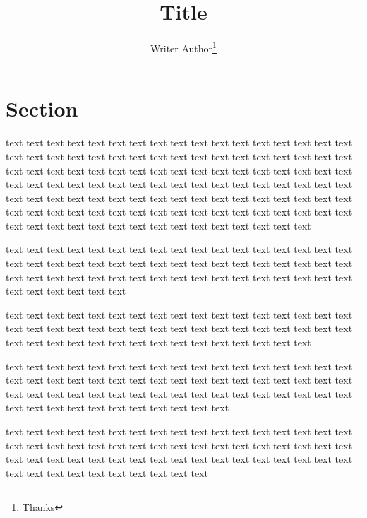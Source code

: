 \documentclass[twocolumn]{article}
\title{Title}
\author{Writer Author\thanks{Thanks}}
\begin{document}
\sloppy%

\maketitle

%
\section{Section}
text text text text text text text text text text text text text text text text text text text text text text text text text text text text text text text text text text text text text text text text text text text text text text text text text text text text text text text text text text text text text text text
    text text text text text text text text text text text text text text text text text text text text text text text text text text text text text text text text text text text text text text text text text text text text text text text text text text text text text text

    text text text text text text text text text text text text text text text text text text text text text text text text text text text text text text text text text text text text text text text text text text text text text text text text text text text text text text text text text

    text text \cite{citation1} text text text text text text text text text text text text text text text text text text text text text text text text text text text text text text text text text text text text text text text text text text text text text text text

    text text text text text text text text text text text text text text text text text text text text text text text text text text text text text text text text text text text text text text text text text text text text text text text text text text text text text text text text text text text text text text

    text text text text text text text text text text text text text text text text text text text text text text text text text text text text text text text text text text text text text text text text text text text text text text text text text text text text text text text text text text text text text
\end{document}
